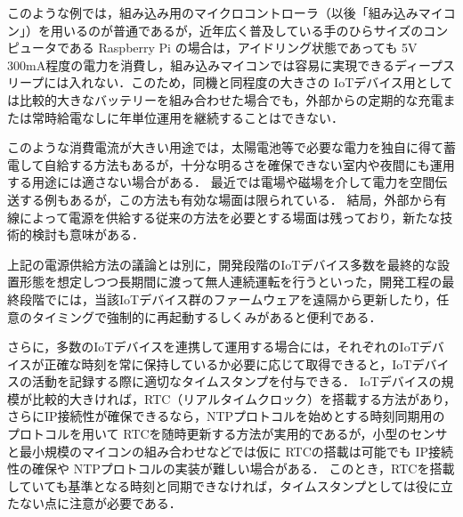 このような例では，組み込み用のマイクロコントローラ（以後「組み込みマイコン」）を用いるのが普通であるが，近年広く普及している手のひらサイズのコンピュータである Raspberry Pi\cite{data:RaspberryPi} の場合は，アイドリング状態であっても 5V 300mA程度の電力を消費し，組み込みマイコンでは容易に実現できるディープスリープには入れない．このため，同機と同程度の大きさの IoTデバイス用としては比較的大きなバッテリーを組み合わせた場合でも，外部からの定期的な充電または常時給電なしに年単位運用を継続することはできない．

このような消費電流が大きい用途では，太陽電池等で必要な電力を独自に得て蓄電して自給する方法もあるが，十分な明るさを確保できない室内や夜間にも運用する用途には適さない場合がある．
最近では電場や磁場を介して電力を空間伝送する例もあるが，この方法も有効な場面は限られている．
結局，外部から有線によって電源を供給する従来の方法を必要とする場面は残っており，新たな技術的検討も意味がある．

上記の電源供給方法の議論とは別に，開発段階のIoTデバイス多数を最終的な設置形態を想定しつつ長期間に渡って無人連続運転を行うといった，開発工程の最終段階でには，当該IoTデバイス群のファームウェアを遠隔から更新したり，任意のタイミングで強制的に再起動するしくみがあると便利である．

さらに，多数のIoTデバイスを連携して運用する場合には，それぞれのIoTデバイスが正確な時刻を常に保持しているか必要に応じて取得できると，IoTデバイスの活動を記録する際に適切なタイムスタンプを付与できる．
IoTデバイスの規模が比較的大きければ，RTC（リアルタイムクロック）を搭載する方法があり，さらにIP接続性が確保できるなら，NTPプロトコルを始めとする時刻同期用のプロトコルを用いて
RTCを随時更新する方法が実用的であるが，小型のセンサと最小規模のマイコンの組み合わせなどでは仮に RTCの搭載は可能でも IP接続性の確保や NTPプロトコルの実装が難しい場合がある．
このとき，RTCを搭載していても基準となる時刻と同期できなければ，タイムスタンプとしては役に立たない点に注意が必要である．

